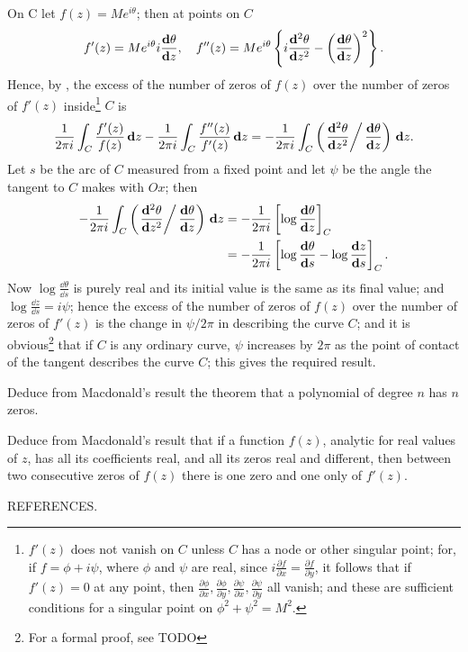 On C let $f(z) = M e^{i\theta}$; then at points on $C$
$$
f'(z) = M e^{i\theta} i \frac{\mathbf{d} \theta}{\mathbf{d} z},
\quad
f''(z)
=
M e^{i\theta}
\left\{ 
  i \frac{ \mathbf{d}^{2} \theta }{ \mathbf{d} z^{2} }
  -
  \left(  \frac{\mathbf{d} \theta}{\mathbf{d} z}  \right)^{2}
 \right\}.
$$
Hence, by , the excess of the number of zeros
of $f(z)$ over the number of zeros of $f'(z)$
inside\footnote{$f'(z)$ does not vanish on $C$ unless $C$ has a node
  or other singular point; for, if $f = \phi + i\psi$,
  where $\phi$ and $\psi$ are real, since
  $i \frac{\partial f}{\partial x} = \frac{\partial f}{\partial y}$,
  it follows that if $f'(z) = 0$ at any point, then
  $\frac{\partial \phi}{\partial x},
  \frac{\partial \phi}{\partial y},
  \frac{\partial \psi}{\partial x},
  \frac{\partial \psi}{\partial y}$
  all vanish; and these are sufficient conditions for a singular point
  on  $\phi^{2} + \psi^{2} = M^{2}$.
} $C$ is
$$
\frac{1}{2\pi i}
\int_{C} \frac{ f'(z) }{f(z)} \, \mathbf{d} z
-
\frac{1}{2\pi i}
\int_{C} \frac{ f''(z) }{ f'(z) } \, \mathbf{d} z
=
-\frac{1}{2 \pi i}
\int_{C} \left( 
  \left.
    \frac{ \mathbf{d}^{2} \theta }{ \mathbf{d} z^{2} }
  \right/
  \frac{\mathbf{d}\theta}{\mathbf{d} z}
   \right) \, \mathbf{d} z.
$$
Let $s$ be the arc of $C$ measured from a fixed point and let $\psi$
be the angle the tangent to $C$ makes with $Ox$; then
\begin{align*}
-\frac{1}{2 \pi i}
\int_{C} \left( 
  \left.
    \frac{ \mathbf{d}^{2} \theta }{ \mathbf{d} z^{2} }
  \right/
  \frac{\mathbf{d}\theta}{\mathbf{d} z}
   \right) \, \mathbf{d} z
  &=
  - \frac{1}{2 \pi i}
  \left[  \log \frac{\mathbf{d}\theta}{\mathbf{d} z}  \right]_{C}
  \\
  &=
  - \frac{1}{2 \pi i}
  \left[ 
    \log \frac{\mathbf{d}\theta}{\mathbf{d} s}
    -
    \log \frac{\mathbf{d} z}{\mathbf{d} s}
   \right]_{C}
  .
\end{align*}
Now $\log \frac{\dd \theta}{\dd s}$ is purely real and its initial
value is the same as its final value; and
$\log \frac{\dd z}{\dd s} = i \psi$; hence the excess of the number of
zeros of $f(z)$ over the number of zeros of
$f'(z)$ is the change in $\psi/2\pi$ in describing the curve $C$; and it is
obvious\footnote{For a formal proof, see TODO} that if $C$ is any
ordinary curve, $\psi$ increases by $2\pi$ as the point of contact of
the tangent describes the curve $C$; this gives the required result.
\begin{wandwexample}
  Deduce from Macdonald's result the theorem that a
  polynomial of degree $n$ has $n$ zeros.
\end{wandwexample}
\begin{wandwexample}
  Deduce from Macdonald's result that if a function $f(z)$,
  analytic for real values of $z$, has all its coefficients real, and all
  its zeros real and different, then between two consecutive zeros of
  $f(z)$ there is one zero and one only of $f'(z)$.
\end{wandwexample}
REFERENCES.

